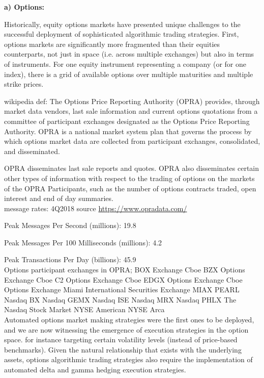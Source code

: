\noindent\textbf{a) Options:} \\


Historically, equity options markets have presented unique challenges to the successful deployment of sophisticated algorithmic trading strategies. First, options markets are significantly more fragmented than their equities counterparts, not just in space (i.e. across multiple exchanges) but also in terms of instruments. For one equity instrument representing a company (or for one index), there is a grid of available options over multiple maturities and multiple strike prices.  

wikipedia def:
The Options Price Reporting Authority (OPRA) provides, through market data vendors, last sale information and current options quotations from a committee of participant exchanges designated as the Options Price Reporting Authority.
OPRA is a national market system plan that governs the process by which options market data are collected from participant exchanges, consolidated, and disseminated.

OPRA disseminates last sale reports and quotes. OPRA also disseminates certain other types of information with respect to the trading of options on the markets of the OPRA Participants, such as the number of options contracts traded, open interest and end of day summaries.\\

message rates: 4Q2018 source \url{https://www.opradata.com/}

Peak Messages Per Second (millions): 19.8

Peak Messages Per 100 Milliseconds (millions): 4.2

Peak Transactions Per Day (billions): 45.9\\




Options participant exchanges in OPRA; 
BOX Exchange
Cboe BZX Options Exchange
Cboe C2 Options Exchange
Cboe EDGX Options Exchange
Cboe Options Exchange
Miami International Securities Exchange
MIAX PEARL
Nasdaq BX
Nasdaq GEMX
Nasdaq ISE
Nasdaq MRX
Nasdaq PHLX
The Nasdaq Stock Market
NYSE American
NYSE Arca\\

Automated options market making strategies were the first ones to be deployed, and we are now witnessing the emergence of execution strategies in the option space. for instance targeting certain volatility levels (instead of price-based benchmarks). Given the natural relationship that exists with the underlying assets, options algorithmic trading strategies also require the implementation of automated delta and gamma hedging execution strategies.

